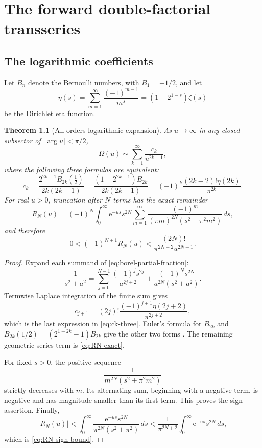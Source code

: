 \documentclass[11pt,a4paper,oneside]{book}
\newtheorem{theorem}{Theorem}[chapter]
\newcommand{\e}{\mathrm e}
\newcommand{\etaD}{\eta}
\begin{document}
\chapter{The forward double-factorial transseries}

\section{The logarithmic coefficients}

Let \(B_n\) denote the Bernoulli numbers, with \(B_1=-1/2\), and let
\[
 \etaD(s)=\sum_{m=1}^\infty\frac{(-1)^{m-1}}{m^s}
 =(1-2^{1-s})\zeta(s)
\]
be the Dirichlet eta function.

\begin{theorem}[All-orders logarithmic expansion]\label{thm:forward-log}
As \(u\to\infty\) in any closed subsector of \(|\arg u|<\pi/2\),
\begin{equation}\label{eq:Omega-series}
 \Omega(u)\sim\sum_{k=1}^\infty\frac{c_k}{u^{2k-1}},
\end{equation}
where the following three formulas are equivalent:
\begin{equation}\label{eq:ck-three}
 \boxed{
 c_k=
 \frac{2^{2k-1}B_{2k}(\tfrac12)}{2k(2k-1)}
 =
 \frac{(1-2^{2k-1})B_{2k}}{2k(2k-1)}
 =
 (-1)^k\frac{(2k-2)!\etaD(2k)}{\pi^{2k}}.}
\end{equation}
For real \(u>0\), truncation after \(N\) terms has the exact remainder
\begin{equation}\label{eq:RN-exact}
 R_N(u)
 =(-1)^N\int_0^\infty \e^{-us}s^{2N}
 \sum_{m=1}^\infty
 \frac{(-1)^m}{(\pi m)^{2N}(s^2+\pi^2m^2)}\,ds,
\end{equation}
and therefore
\begin{equation}\label{eq:RN-sign-bound}
 0<(-1)^{N+1}R_N(u)
 <\frac{(2N)!}{\pi^{2N+2}u^{2N+1}}.
\end{equation}
\end{theorem}

\begin{proof}
Expand each summand of \cref{eq:borel-partial-fraction}:
\[
 \frac1{s^2+a^2}
 =\sum_{j=0}^{N-1}\frac{(-1)^js^{2j}}{a^{2j+2}}
 +\frac{(-1)^Ns^{2N}}{a^{2N}(s^2+a^2)}.
\]
Termwise Laplace integration of the finite sum gives
\[
 c_{j+1}
 =(2j)!\frac{(-1)^{j+1}\etaD(2j+2)}{\pi^{2j+2}},
\]
which is the last expression in \cref{eq:ck-three}.  Euler's formula for
\(B_{2k}\) and
\(B_{2k}(1/2)=(2^{1-2k}-1)B_{2k}\) give the other two forms
\cite{DLMF-Bernoulli}.  The remaining geometric-series term is
\cref{eq:RN-exact}.

For fixed \(s>0\), the positive sequence
\[
 \frac{1}{m^{2N}(s^2+\pi^2m^2)}
\]
strictly decreases with \(m\).  Its alternating sum, beginning with a negative
term, is negative and has magnitude smaller than its first term.  This proves
the sign assertion.  Finally,
\[
 |R_N(u)|
 <\int_0^\infty
 \frac{\e^{-us}s^{2N}}{\pi^{2N}(s^2+\pi^2)}\,ds
 <\frac1{\pi^{2N+2}}
 \int_0^\infty\e^{-us}s^{2N}\,ds,
\]
which is \cref{eq:RN-sign-bound}.
\end{proof}
\end{document}
